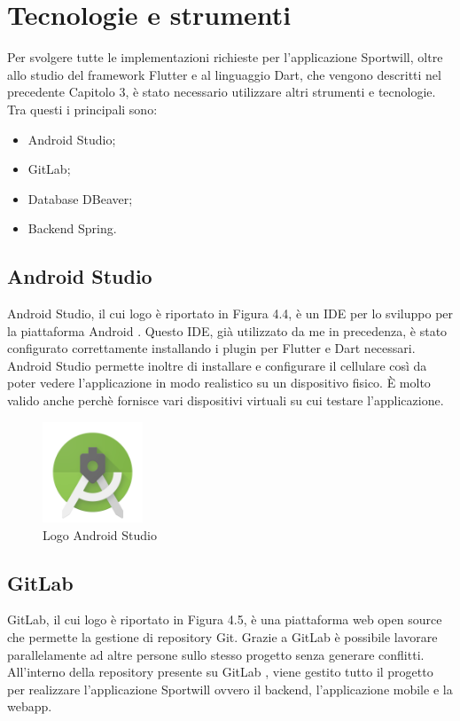 \newpage

\section{Tecnologie e strumenti}
Per svolgere tutte le implementazioni richieste per l'applicazione Sportwill, oltre allo studio del framework Flutter e al linguaggio Dart, che vengono descritti nel precedente Capitolo 3, è stato necessario utilizzare altri strumenti e tecnologie.\\
Tra questi i principali sono:
\begin{itemize}
	\item Android Studio;
	\item GitLab;
	\item Database DBeaver;
	\item Backend Spring.
\end{itemize}

\subsection{Android Studio}
Android Studio, il cui logo è riportato in Figura 4.4, è un IDE per lo sviluppo per la piattaforma Android \cite{android}.
Questo IDE, già utilizzato da me in precedenza, è stato configurato correttamente installando i plugin per Flutter e Dart necessari.\\
Android Studio permette inoltre di installare e configurare il cellulare così da poter vedere l'applicazione in modo realistico su un dispositivo fisico.
È molto valido anche perchè fornisce vari dispositivi virtuali su cui testare l'applicazione.

\begin{figure}[htbp]	
	\centering
	\includegraphics[width=3cm]{immagini/logoandroidstudio.png}
	\caption{Logo Android Studio}
	\label{fig:Logo Android Studio}
\end{figure}

\subsection{GitLab}
GitLab, il cui logo è riportato in Figura 4.5, è una piattaforma web open source che permette la gestione di repository Git.
Grazie a GitLab è possibile lavorare parallelamente
ad altre persone sullo stesso progetto senza generare conflitti.
All'interno della repository presente su GitLab \cite{repo}, viene gestito tutto il progetto per realizzare l'applicazione Sportwill ovvero il backend, l'applicazione mobile e la webapp.\\

